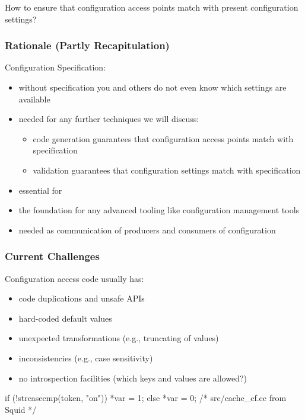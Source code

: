 \begin{assignment}
	\begin{task}
	How to ensure that configuration access points match with present configuration settings?
	\end{task}
\end{assignment}

\begin{frame}
	\frametitle{Rationale (Partly Recapitulation)}
	Configuration Specification:
	\begin{itemize}
	\item without specification you and others do not even know which settings are available
	\item needed for any further techniques we will discuss:
		\begin{itemize}
		\color{red}
		\item code generation guarantees that configuration access points match with specification
		\item validation guarantees that configuration settings match with specification
		\end{itemize}
	\item essential for ~\citet{holland2001nofutz}
	\item the foundation for any advanced tooling like configuration management tools
	\item needed as communication of producers and consumers of configuration
	\end{itemize}
\end{frame}

\begin{frame}[fragile]
	\frametitle{Current Challenges}
	Configuration access code usually has:
	\pause
	\begin{itemize}
	\item code duplications and unsafe APIs
	\item hard-coded default values
	\item unexpected transformations (e.g., truncating of values)
	\item inconsistencies (e.g., case sensitivity)
	\item no introspection facilities (which keys and values are allowed?)
	\end{itemize}
	\begin{example}
	\begin{code}[gobble=4,language=C++]
	if (!strcasecmp(token, "on")) {
		*var = 1;
	} else {
		*var = 0;
	} /* src/cache_cf.cc from Squid */
	\end{code}\end{example}
\end{frame}

